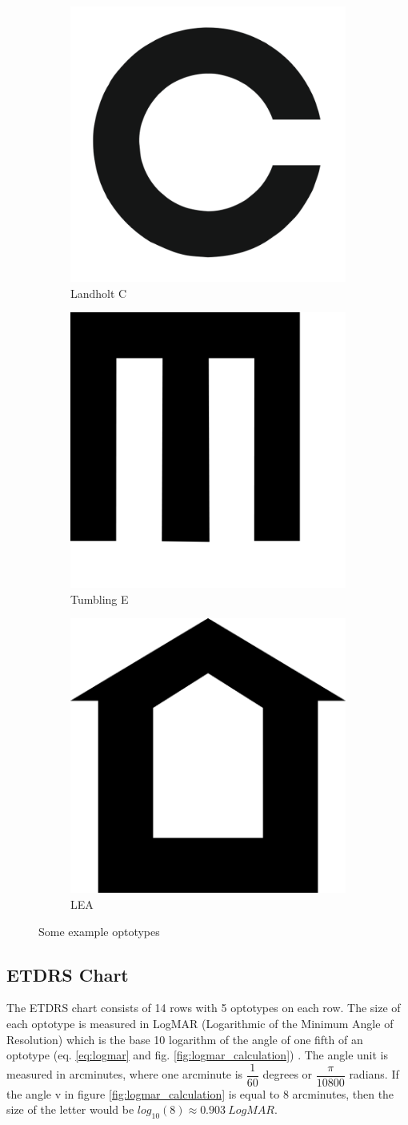 \documentclass[12pt,a4paper,notitlepage]{report}
\begin{document}
\begin{figure}[h]
\centering
\begin{subfigure}{.3\textwidth}
  \centering
  \includegraphics[width=.4\linewidth]{images/landholt_c_optotype.png}
  \caption{Landholt C}
  \label{fig:landholt_c}
\end{subfigure}%
\begin{subfigure}{.3\textwidth}
  \centering
  \includegraphics[width=.4\linewidth]{images/tumbling_e_optotype.png}
  \caption{Tumbling E}
  \label{fig:tumbling_e}
\end{subfigure}
\begin{subfigure}{.3\textwidth}
  \centering
  \includegraphics[width=.4\linewidth]{images/lea_optotype.png}
  \caption{LEA}
  \label{fig:lea}
\end{subfigure}
\caption{Some example optotypes}
\label{fig:optotypes_example}
\end{figure}

\subsection{ETDRS Chart}
The ETDRS chart consists of 14 rows with 5 optotypes on each row. The size of each optotype is measured in LogMAR (Logarithmic of the Minimum Angle of Resolution) which is the base 10 logarithm of the angle of one fifth of an optotype (eq. \ref{eq:logmar} and fig. \ref{fig:logmar_calculation}) \cite{Bailey}. The angle unit is measured in arcminutes, where one arcminute is $\dfrac{1}{60}$ degrees or $\dfrac{\pi}{10800}$ radians. If the angle v in figure \ref{fig:logmar_calculation} is equal to 8 arcminutes, then the size of the letter would be $log_{10}(8) \approx 0.903\ LogMAR$.
\end{document}

